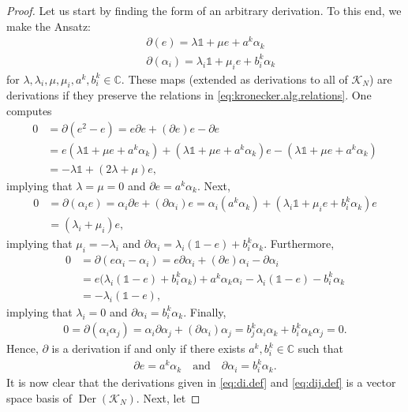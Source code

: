 \documentclass{amsart}
\newcommand{\complex}{\mathbb{C}}
\newcommand{\paraa}[1]{\big(#1\big)}
\theoremstyle{definition}
\theoremstyle{remark}
\numberwithin{equation}{section}
\newcommand{\K}{\mathcal{K}}
\renewcommand{\mid}{\mathds{1}}
\newcommand{\KN}{\K_N}
\renewcommand{\d}{\partial}
\newcommand{\Der}{\operatorname{Der}}
\newcommand{\qand}{\quad\text{and}\quad}
\begin{document}
\begin{proof}
  Let us start by finding the form of an arbitrary derivation. To this
  end, we make the Ansatz:
  \begin{align*}
    &\d(e) = \lambda\mid + \mu e + a^k\alpha_k\\\
    &\d(\alpha_i) = \lambda_i\mid + \mu_ie+ b_i^k\alpha_k
  \end{align*}
  for $\lambda,\lambda_i,\mu,\mu_i,a^k,b_i^k\in\complex$. These maps
  (extended as derivations to all of $\KN$) are derivations if they
  preserve the relations in \eqref{eq:kronecker.alg.relations}. One computes
  \begin{align*}
    0 &= \d(e^2-e) = e\d e+(\d e)e -\d e\\
      &= e(\lambda\mid + \mu e + a^k\alpha_k)+(\lambda\mid + \mu e + a^k\alpha_k)e-(\lambda\mid + \mu e + a^k\alpha_k)\\
      &= -\lambda\mid  + (2\lambda+\mu)e,
  \end{align*}
  implying that $\lambda=\mu=0$ and $\d e = a^k\alpha_k$. Next,
  \begin{align*}
    0 &= \d(\alpha_ie) = \alpha_i\d e + (\d\alpha_i)e
        = \alpha_i(a^k\alpha_k) + (\lambda_i\mid + \mu_ie + b_i^k\alpha_k)e\\
      &= (\lambda_i+\mu_i)e,
  \end{align*}
  implying that $\mu_i=-\lambda_i$ and $\d\alpha_i = \lambda_i(\mid-e)+b_i^k\alpha_k$. Furthermore,
  \begin{align*}
    0 &= \d(e\alpha_i-\alpha_i) = e\d\alpha_i + (\d e)\alpha_i - \d\alpha_i\\
      &= e\paraa{\lambda_i(\mid-e)+b_i^k\alpha_k} + a^k\alpha_k\alpha_i-\lambda_i(\mid-e)-b_i^k\alpha_k\\
      &= -\lambda_i(\mid-e),
  \end{align*}
  implying that $\lambda_i=0$ and $\d\alpha_i = b_i^k\alpha_k$. Finally,
  \begin{align*}
    0=\d(\alpha_i\alpha_j) = \alpha_i\d\alpha_j + (\d\alpha_i)\alpha_j
    = b_j^k\alpha_i\alpha_k + b_i^k\alpha_k\alpha_j = 0.
  \end{align*}
  Hence, $\d$ is a derivation if and only if there exists $a^k,b_i^k\in\complex$ such that
  \begin{align*}
    \d e = a^k\alpha_k\qand
    \d\alpha_i = b_i^k\alpha_k.
  \end{align*}
  It is now clear that the derivations given in \eqref{eq:di.def} and
  \eqref{eq:dij.def} is a vector space basis of $\Der(\KN)$. Next, let

\end{proof}
\end{document}
